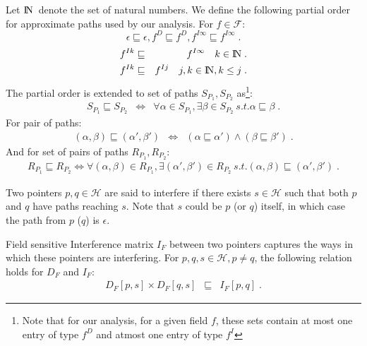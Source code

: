 \documentclass[runningheads,a4paper]{llncs}
\newcommand{\p}{\ensuremath{p}}
\newcommand{\q}{\ensuremath{q}}
\newcommand{\s}{\ensuremath{s}}
\newcommand{\drct}{\ensuremath{D}}
\newcommand{\indrct}{\ensuremath{I}}
\newcommand{\heap}{\ensuremath{\mathcal{H}}}
\newcommand{\fields}{\ensuremath{\mathcal{F}}}
\newcommand{\nat}{\ensuremath{\bbbn}}
\newcommand{\DFM}[2]{\ensuremath{D_F[#1,#2]}}
\newcommand{\IFM}[2]{\ensuremath{I_F[#1,#2]}}
\newcommand{\sub}[2]{\ensuremath{{#1}_{#2}}}
\begin{document}
Let \nat\ denote the set of natural numbers. We define the
following partial order for approximate paths used by our
analysis. For $ f \in \fields$:
$$
  \epsilon \sqsubseteq \epsilon, 
    f^\drct \sqsubseteq  f^\drct,  
    f^{\indrct\infty}  \sqsubseteq  f^{\indrct\infty} \; .
$$ \vskip -8mm
 \begin{eqnarray*}
    f^{\indrct k} & \sqsubseteq & f^{\indrct\infty} \quad k \in
    \nat \; .\\
    f^{\indrct k} &\sqsubseteq& f^{\indrct j} \quad j, k \in
    \nat, k \leq j \; . 	 
\end{eqnarray*}
The partial order is extended to set of paths $S_{P_1},
S_{P_2}$ as\footnote{Note that for our analysis, for a given
  field $f$, these sets contain at most one entry of type
  $f^\drct$ and atmost one entry of type $f^\indrct$}:
\begin{eqnarray*}
  S_{P_1} \sqsubseteq S_{P_2} &\Leftrightarrow& \forall \alpha \in
  S_{P_1}, \exists \beta \in S_{P_2}\ s.t. \alpha \sqsubseteq \beta \; .
\end{eqnarray*}
For pair of paths:
\begin{eqnarray*}
  (\alpha, \beta) \sqsubseteq (\alpha', \beta') &
  \Leftrightarrow &
   (\alpha \sqsubseteq \alpha')  \wedge
  (\beta \sqsubseteq  \beta') \; .
\end{eqnarray*}
And for set of pairs of paths $R_{P_1}, R_{P_2}$:
\begin{eqnarray*}
  R_{P_1} \sqsubseteq R_{P_2} \Leftrightarrow \forall
  (\alpha, \beta) \in
  R_{P_1}, \exists (\alpha', \beta') \in
  R_{P_2}\ s.t. (\alpha, \beta) \sqsubseteq (\alpha', \beta') \; .
\end{eqnarray*}


Two pointers $\p,\q \in \heap$ are said to
interfere if there exists $\s \in \heap$ such that both
$\p$ and $\q$ have paths reaching $\s$. Note that $\s$ could
be $\p$ (or $\q$) itself, in which case the path from $\p$
($\q$) is $\epsilon$.

\begin{definition}\label{IFM_matrix}
Field sensitive Interference matrix $\sub{I}{F}$ between
two pointers captures the ways in which these pointers are
interfering.  For $\p, \q, \s \in \heap, \p \not= \q$,
the following relation holds for $D_F$ and $I_F$: 
\begin{eqnarray*}
  \DFM{p}{s} \times \DFM{q}{s} &\sqsubseteq&
  \IFM{p}{q} \; . \label {eq:rel-df-if}
\end{eqnarray*}
\end{definition}
\end{document}
